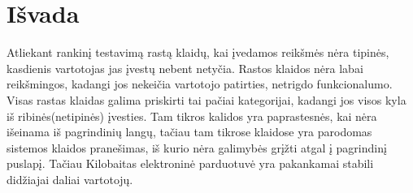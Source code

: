 \documentclass{VUMIFPSkursinis}
\begin{document}
\section{Išvada}
Atliekant rankinį testavimą rastą klaidų, kai įvedamos reikšmės nėra tipinės, kasdienis vartotojas jas įvestų nebent netyčia. Rastos klaidos nėra labai reikšmingos, kadangi jos nekeičia vartotojo patirties, netrigdo funkcionalumo. Visas rastas klaidas galima priskirti tai pačiai kategorijai, kadangi jos visos kyla iš ribinės(netipinės) įvesties. Tam tikros kalidos yra paprastesnės, kai nėra išeinama iš pagrindinių langų, tačiau tam tikrose klaidose yra parodomas sistemos klaidos pranešimas, iš kurio nėra galimybės grįžti atgal į pagrindinį puslapį. Tačiau Kilobaitas elektroninė parduotuvė yra pakankamai stabili didžiajai daliai vartotojų.
\end{document}
